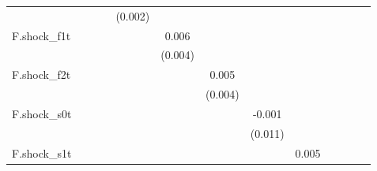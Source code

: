 {\begin{tabular}{l*{12}{c}}
            &                     &                     &                     &     (0.002)         &                     &                     &                     &                     &                     &                     &                     &                     \\
\addlinespace
F.shock\_f1t &                     &                     &                     &                     &       0.006         &                     &                     &                     &                     &                     &                     &                     \\
            &                     &                     &                     &                     &     (0.004)         &                     &                     &                     &                     &                     &                     &                     \\
\addlinespace
F.shock\_f2t &                     &                     &                     &                     &                     &       0.005         &                     &                     &                     &                     &                     &                     \\
            &                     &                     &                     &                     &                     &     (0.004)         &                     &                     &                     &                     &                     &                     \\
\addlinespace
F.shock\_s0t &                     &                     &                     &                     &                     &                     &      -0.001         &                     &                     &                     &                     &                     \\
            &                     &                     &                     &                     &                     &                     &     (0.011)         &                     &                     &                     &                     &                     \\
\addlinespace
F.shock\_s1t &                     &                     &                     &                     &                     &                     &                     &       0.005         &                     &                     &                     &                     \\

\end{tabular}}
